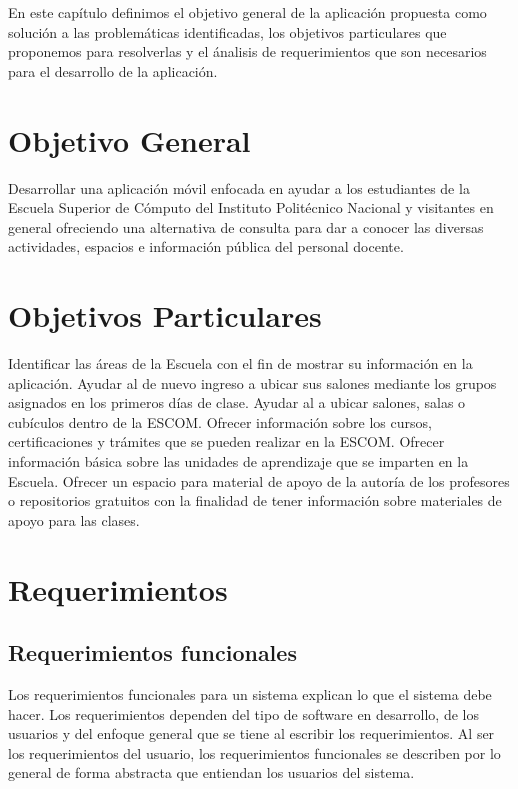 En este capítulo definimos el objetivo general de la aplicación propuesta como solución a las problemáticas identificadas, los objetivos particulares que proponemos para resolverlas y el ánalisis de requerimientos que son necesarios para el desarrollo de la aplicación.

\section{Objetivo General}

	Desarrollar una aplicación móvil enfocada en ayudar a los estudiantes de la Escuela Superior de Cómputo del Instituto Politécnico Nacional y visitantes en general ofreciendo una alternativa de consulta para dar a conocer las diversas actividades, espacios e información pública del personal docente.
	
	\section{Objetivos Particulares}	
	
	
	
	\begin{UClist}
		\UCli Identificar las áreas de la Escuela con el fin de mostrar su información en la aplicación.
		\UCli Ayudar al  de nuevo ingreso a ubicar sus salones mediante los grupos asignados en los primeros días de clase.
		\UCli Ayudar al  a ubicar salones, salas o cubículos dentro de la ESCOM.
		\UCli Ofrecer información sobre los cursos, certificaciones y trámites que se pueden realizar en la ESCOM.
		\UCli Ofrecer información básica sobre las unidades de aprendizaje que se imparten en la Escuela.
		\UCli Ofrecer un espacio para material de apoyo de la autoría de los profesores o repositorios gratuitos con la finalidad de tener información sobre materiales de apoyo para las clases.
	\end{UClist}
	
	\section{Requerimientos}
	\subsection{Requerimientos funcionales}
	
	Los requerimientos funcionales para un sistema explican lo que el sistema debe hacer. Los requerimientos dependen del tipo de software en desarrollo, de los usuarios y del enfoque general que se tiene al escribir los requerimientos. Al ser los requerimientos del usuario, los requerimientos funcionales se describen por lo general de forma abstracta que entiendan los usuarios del sistema. \cite{15}
	
